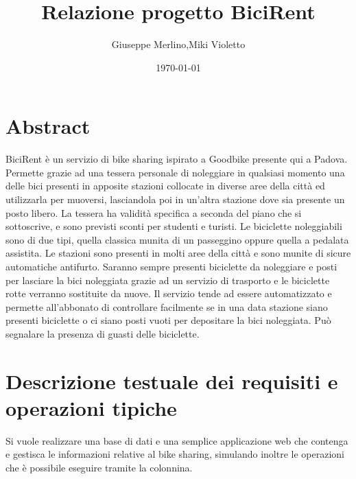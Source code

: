 \documentclass[a4paper,twoside]{article}
\author{Giuseppe Merlino,Miki Violetto}
\title{Relazione progetto BiciRent}
\date{\today}
\begin{document}
\maketitle

\newpage
\tableofcontents
\newpage
\listoffigures
\newpage

%

\section{Abstract}
BiciRent è un servizio di bike sharing ispirato a Goodbike presente qui a Padova.\newline
Permette grazie ad una tessera personale di noleggiare in qualsiasi momento una delle bici presenti in apposite stazioni collocate in diverse aree della città ed utilizzarla per muoversi, lasciandola poi in un'altra stazione dove sia presente un posto libero.\newline
La tessera ha validità specifica a seconda del piano che si sottoscrive, e sono previsti sconti per studenti e turisti.\newline
Le biciclette noleggiabili sono di due tipi, quella classica munita di un passeggino oppure quella a pedalata assistita.\newline
Le stazioni sono presenti in molti aree della città e sono munite di sicure automatiche antifurto. Saranno sempre presenti biciclette da noleggiare e posti per lasciare la bici noleggiata grazie ad un servizio di trasporto e le biciclette rotte verranno sostituite da nuove.\newline
Il servizio tende ad essere automatizzato e permette all'abbonato di controllare facilmente se in una data stazione siano presenti biciclette o ci siano posti vuoti per depositare la bici noleggiata. Può segnalare la presenza di guasti delle biciclette.\newline

\section{Descrizione testuale dei requisiti e operazioni tipiche}
Si vuole realizzare una base di dati e una semplice applicazione web che contenga e gestisca le informazioni relative al bike sharing, simulando inoltre le operazioni che è possibile eseguire tramite la colonnina.
\end{document}
